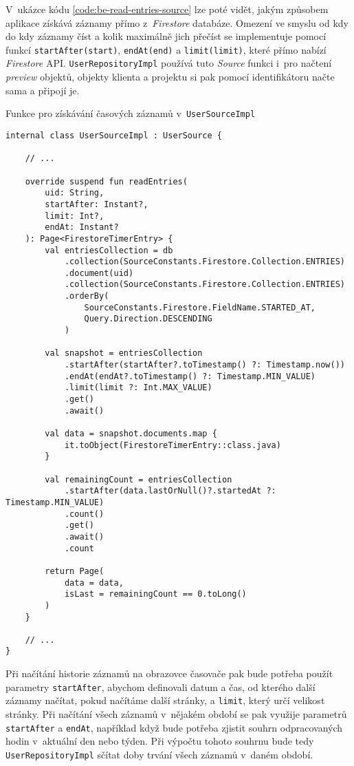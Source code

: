 V~ukázce kódu \ref{code:be-read-entries-source} lze poté vidět, jakým způsobem aplikace získává záznamy přímo z~\emph{Firestore} databáze. Omezení ve smyslu od kdy do kdy záznamy číst a kolik maximálně jich přečíst se implementuje pomocí funkcí \texttt{startAfter(start)}, \texttt{endAt(end)} a \texttt{limit(limit)}, které přímo nabízí \emph{Firestore} API. \texttt{UserRepositoryImpl} používá tuto \emph{Source} funkci i~pro načtení \emph{preview} objektů, objekty klienta a projektu si pak pomocí identifikátoru načte sama a připojí je.

\begin{listing}
\caption{Funkce pro získávání časových záznamů v~\texttt{UserSourceImpl}}\label{code:be-read-entries-source}
\begin{verbatim}
internal class UserSourceImpl : UserSource {

    // ...
    
    override suspend fun readEntries(
        uid: String,
        startAfter: Instant?,
        limit: Int?,
        endAt: Instant?
    ): Page<FirestoreTimerEntry> {
        val entriesCollection = db
            .collection(SourceConstants.Firestore.Collection.ENTRIES)
            .document(uid)
            .collection(SourceConstants.Firestore.Collection.ENTRIES)
            .orderBy(
                SourceConstants.Firestore.FieldName.STARTED_AT, 
                Query.Direction.DESCENDING
            )

        val snapshot = entriesCollection
            .startAfter(startAfter?.toTimestamp() ?: Timestamp.now())
            .endAt(endAt?.toTimestamp() ?: Timestamp.MIN_VALUE)
            .limit(limit ?: Int.MAX_VALUE)
            .get()
            .await()

        val data = snapshot.documents.map { 
            it.toObject(FirestoreTimerEntry::class.java) 
        }

        val remainingCount = entriesCollection
            .startAfter(data.lastOrNull()?.startedAt ?: Timestamp.MIN_VALUE)
            .count()
            .get()
            .await()
            .count

        return Page(
            data = data,
            isLast = remainingCount == 0.toLong()
        )
    }
    
    // ...
}
\end{verbatim}
\end{listing}

Při načítání historie záznamů na obrazovce časovače pak bude potřeba použít parametry \texttt{startAfter}, abychom definovali datum a čas, od kterého další záznamy načítat, pokud načítáme další stránky, a \texttt{limit}, který určí velikost stránky. Při načítání všech záznamů v~nějakém období se pak využije parametrů \texttt{startAfter} a \texttt{endAt}, například když bude potřeba zjistit souhrn odpracovaných hodin v~aktuální den nebo týden. Při výpočtu tohoto souhrnu bude tedy \texttt{UserRepositoryImpl} sčítat doby trvání všech záznamů v~daném období.

